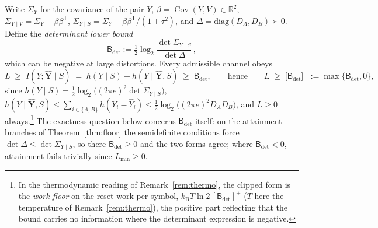 ﻿\documentclass[11pt,onecolumn]{IEEEtran}
\newcommand{\R}{\mathbb{R}}
\newcommand{\Cov}{\operatorname{Cov}}
\newcommand{\hY}{\widehat{Y}}
\newcommand{\Bdet}{\mathsf{B}_{\det}}
\newcommand{\kb}{k_{\mathrm{B}}}
\begin{document}
Write $\Sigma_Y$ for the covariance of the pair $Y$,
$\beta=\Cov(Y,V)\in\R^2$, $\Sigma_{Y\mid V}=\Sigma_Y-\beta\beta^{\mathsf T}$,
$\Sigma_{Y\mid S}=\Sigma_Y-\beta\beta^{\mathsf T}/(1{+}\tau^2)$, and
$\Delta=\mathrm{diag}(D_A,D_B)\succ0$. Define the \emph{determinant lower
bound}
\[
\Bdet:=\tfrac12\log_2\frac{\det\Sigma_{Y\mid S}}{\det\Delta}\,,
\]
which can be negative at large distortions. Every admissible channel obeys
\begin{equation}
 L\;\ge\;I(Y;\hat{\mathbf Y}\mid S)
 \;=\;h(Y\mid S)-h(Y\mid\hat{\mathbf Y},S)
 \;\ge\;\Bdet,
 \qquad\text{hence}\qquad
 L\;\ge\;\bigl[\Bdet\bigr]^{+}:=\max\{\Bdet,0\},
 \label{eq:floor}
\end{equation}
since $h(Y\mid S)=\tfrac12\log_2\bigl((2\pi e)^2\det\Sigma_{Y\mid S}\bigr)$,
$h(Y\mid\hat{\mathbf Y},S)\le\sum_{i\in\{A,B\}}h(Y_i-\hY_i)
\le\tfrac12\log_2\bigl((2\pi e)^2 D_AD_B\bigr)$, and $L\ge0$
always.\footnote{In the thermodynamic reading of
Remark~\ref{rem:thermo}, the clipped form is the \emph{work floor} on
the reset work per symbol, $\kb T\ln2\,[\Bdet]^{+}$ ($T$ here the
temperature of Remark~\ref{rem:thermo}), the positive part
reflecting that the bound carries no information where the determinant
expression is negative.} The exactness
question below concerns $\Bdet$ itself: on the attainment branches of
Theorem~\ref{thm:floor} the semidefinite conditions force
$\det\Delta\le\det\Sigma_{Y\mid S}$, so there $\Bdet\ge0$ and the two
forms agree; where $\Bdet<0$, attainment fails trivially since
$L_{\min}\ge0$.
\end{document}
